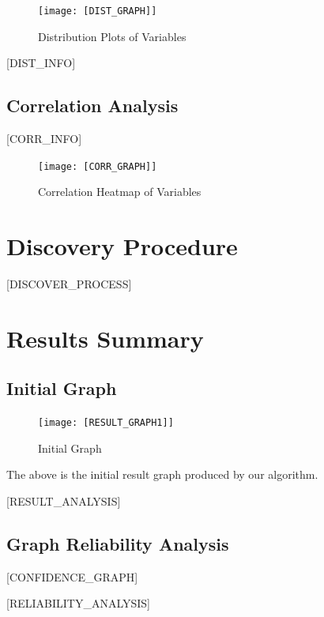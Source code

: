 \documentclass{article}
\begin{document}
\begin{figure}[H]
\centering
\texttt{[image: [DIST\_GRAPH]]}
\caption{\label{fig:dist}Distribution Plots of Variables}
\end{figure}

[DIST_INFO]

\subsection{Correlation Analysis}

\begin{minipage}[t]{0.5\linewidth}
    [CORR_INFO]
\vfill
\end{minipage}
\hfill
\begin{minipage}[t]{0.5\linewidth}
    \begin{figure}[H]
        \centering
        \vspace{-1.5cm}
        \texttt{[image: [CORR\_GRAPH]]}
        \caption{\label{fig:corr}Correlation Heatmap of Variables}
    \end{figure}
\end{minipage}

\section{Discovery Procedure}
[DISCOVER_PROCESS]

\section{Results Summary}

\subsection{Initial Graph}

\begin{figure}[H]
    \centering
    \texttt{[image: [RESULT\_GRAPH1]]}
    \caption{Initial Graph}
\end{figure}

The above is the initial result graph produced by our algorithm.

[RESULT_ANALYSIS]

\subsection{Graph Reliability Analysis}

[CONFIDENCE_GRAPH]

[RELIABILITY_ANALYSIS]

\end{document}
